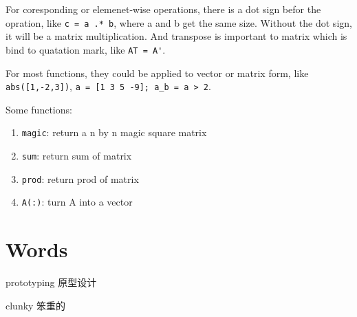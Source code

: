 \documentclass[en,11pt,english,black,simple]{../elegantbook}
\begin{document}
For coresponding or elemenet-wise operations, there is a dot sign befor the opration, like \lstinline{c = a .* b}, where a and b get the same size. Without the dot sign, it will be a matrix multiplication. And transpose is important to matrix which is bind to quatation mark, like \lstinline{AT = A'}.

For most functions, they could be applied to vector or matrix form, like \lstinline{abs([1,-2,3])}, \lstinline{a = [1 3 5 -9]; a_b = a > 2}.



Some functions:

\begin{enumerate}
    \item \lstinline{magic}: return a n by n magic square matrix
    \item \lstinline{sum}: return sum of matrix
    \item \lstinline{prod}: return prod of matrix
    \item \lstinline{A(:)}: turn A into a vector
\end{enumerate}


\section*{Words}

prototyping 原型设计

clunky 笨重的


\let\chapname\undefined
\ifx\mainclass\undefined
\end{document}
